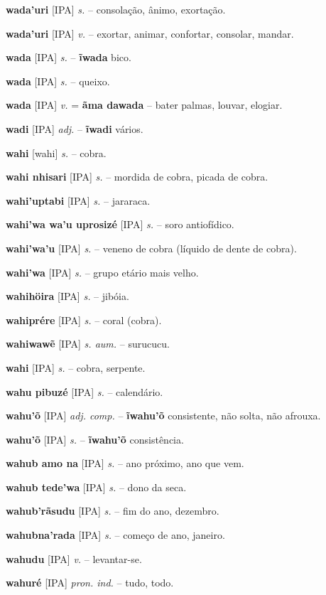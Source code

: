 \textbf{wada'uri} [IPA] \textit{s.} -- consolação, ânimo, exortação.

\textbf{wada'uri} [IPA] \textit{v.} -- exortar, animar, confortar, consolar, mandar.

\textbf{wada} [IPA] \textit{s.} -- \textbf{ĩwada} bico.

\textbf{wada} [IPA] \textit{s.} -- queixo.

\textbf{wada} [IPA] \textit{v.} = \textbf{ãma dawada} -- bater palmas, louvar, elogiar.

\textbf{wadi} [IPA] \textit{adj.} -- \textbf{ĩwadi} vários.

\textbf{wahi} [wahi] \textit{s.} -- cobra.

\textbf{wahi nhisari} [IPA] \textit{s.} -- mordida de cobra, picada de cobra.

\textbf{wahi'uptabi} [IPA] \textit{s.} -- jararaca.

\textbf{wahi'wa wa'u uprosizé} [IPA] \textit{s.} -- soro antiofídico.

\textbf{wahi'wa'u} [IPA] \textit{s.} -- veneno de cobra (líquido de dente de cobra).

\textbf{wahi'wa} [IPA] \textit{s.} -- grupo etário mais velho.

\textbf{wahihöira} [IPA] \textit{s.} -- jibóia.

\textbf{wahiprére} [IPA] \textit{s.} -- coral (cobra).

\textbf{wahiwawẽ} [IPA] \textit{s. aum.} -- surucucu.

\textbf{wahi} [IPA] \textit{s.} -- cobra, serpente.

\textbf{wahu pibuzé} [IPA] \textit{s.} -- calendário.

\textbf{wahu'õ} [IPA] \textit{adj. comp.} -- \textbf{ĩwahu'õ} consistente, não solta, não afrouxa.

\textbf{wahu'õ} [IPA] \textit{s.} -- \textbf{ĩwahu'õ} consistência.

\textbf{wahub amo na} [IPA] \textit{s.} -- ano próximo, ano que vem.

\textbf{wahub tede'wa} [IPA] \textit{s.} -- dono da seca.

\textbf{wahub'rãsudu} [IPA] \textit{s.} -- fim do ano, dezembro.

\textbf{wahubna'rada} [IPA] \textit{s.} -- começo de ano, janeiro.

\textbf{wahudu} [IPA] \textit{v.} -- levantar-se.

\textbf{wahuré} [IPA] \textit{pron. ind.} -- tudo, todo.

